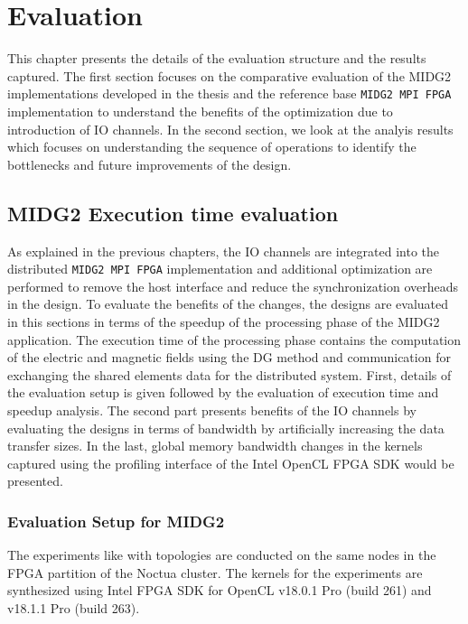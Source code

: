 \chapter{Evaluation}
\label{cha:Evaluation}

This chapter presents the details of the evaluation structure and the results
captured. The first section focuses on the comparative evaluation of
the MIDG2 implementations developed in the thesis and the reference base \texttt{MIDG2
MPI FPGA} implementation to understand the benefits of the optimization due to introduction
of IO channels. In the second section, we look at the analyis results which
focuses on understanding the sequence of operations to identify the bottlenecks
and future improvements of the design.


\section{MIDG2 Execution time evaluation}

As explained in the previous chapters, the IO channels are integrated into the
distributed \texttt{MIDG2 MPI FPGA} implementation and additional optimization are performed
to remove the host interface and reduce the synchronization overheads in the design.
To evaluate the benefits of the changes, the designs are evaluated in this sections
in terms of the speedup of the processing phase of the MIDG2 application. The execution
time of the processing phase contains the computation of the electric
and magnetic fields using the \ac{DG} method and communication for exchanging the
shared elements data for the distributed system. First, details of the
evaluation setup is given followed by the evaluation of execution
time and speedup analysis. The second part presents benefits of the IO
channels by evaluating the designs in terms of bandwidth by artificially
increasing the data transfer sizes. In the last, global memory bandwidth
changes in the kernels captured using the profiling interface of the Intel
OpenCL FPGA SDK would be presented.

\subsection{Evaluation Setup for MIDG2}

The experiments like with topologies are conducted on the same
nodes in the FPGA partition of the Noctua cluster. The kernels
for the experiments are synthesized using Intel FPGA SDK for OpenCL
v18.0.1 Pro (build 261) and v18.1.1 Pro (build 263).

